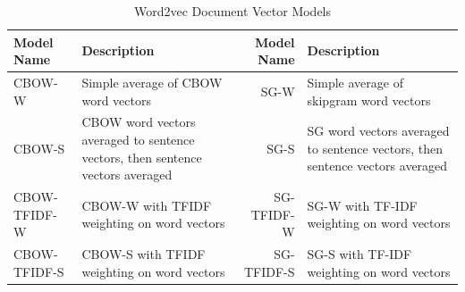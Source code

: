 \begin{table}[h!]
\begin{center}
\caption{Word2vec Document Vector Models}
\label{tab:aggmods}
\begin{tabular}{||L|p{4cm}|N|p{4cm}||}
\hline
Model Name & Description & Model Name & Description\\
\hline
CBOW-W & \small{Simple average of CBOW word vectors} & SG-W & \small{Simple average of skipgram word vectors}\\
\hline
CBOW-S & \small{CBOW word vectors averaged to sentence vectors, then sentence vectors averaged} & SG-S & \small{SG word vectors averaged to sentence vectors, then sentence vectors averaged}\\
\hline
CBOW-TFIDF-W & \small{CBOW-W with TFIDF weighting on word vectors} & SG-TFIDF-W & \small{SG-W with TF-IDF weighting on word vectors} \\
\hline
CBOW-TFIDF-S & \small{CBOW-S with TFIDF weighting on word vectors} & SG-TFIDF-S & \small{SG-S with TF-IDF weighting on word vectors}\\
\hline
\end{tabular}
\end{center}
\end{table}

\newpage

